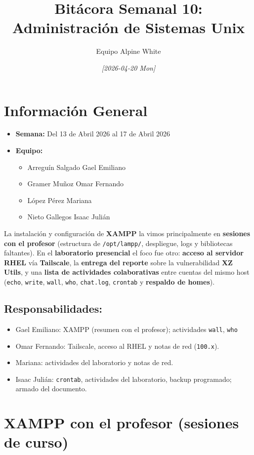 \documentclass[11pt, letterpaper]{article}
\author{Equipo Alpine White}
\date{\textit{{[}2026-04-20 Mon]}}
\title{Bitácora Semanal 10: Administración de Sistemas Unix}
\begin{document}
\maketitle
\setcounter{tocdepth}{2}
\tableofcontents

\section{Información General}
\label{sec:orge581e29}
\begin{itemize}
\item \textbf{Semana:} Del 13 de Abril 2026 al 17 de Abril 2026
\item \textbf{Equipo:}
\begin{itemize}
\item Arreguín Salgado Gael Emiliano
\item Gramer Muñoz Omar Fernando
\item López Pérez Mariana
\item Nieto Gallegos Isaac Julián
\end{itemize}
\end{itemize}

La instalación y configuración de \textbf{XAMPP} la vimos principalmente en \textbf{sesiones con el profesor} (estructura de \texttt{/opt/lampp/}, despliegue, logs y bibliotecas faltantes). En el \textbf{laboratorio presencial} el foco fue otro: \textbf{acceso al servidor RHEL} vía \textbf{Tailscale}, la \textbf{entrega del reporte} sobre la vulnerabilidad \textbf{XZ Utils}, y una \textbf{lista de actividades colaborativas} entre cuentas del mismo host (\texttt{echo}, \texttt{write}, \texttt{wall}, \texttt{who}, \texttt{chat.log}, \texttt{crontab} y \textbf{respaldo de homes}).
\subsection{Responsabilidades:}
\label{sec:org053edf2}
\begin{itemize}
\item Gael Emiliano: XAMPP (resumen con el profesor); actividades \texttt{wall}, \texttt{who}
\item Omar Fernando: Tailscale, acceso al RHEL y notas de red (\texttt{100.x}).
\item Mariana: actividades del laboratorio y notas de red.
\item Isaac Julián: \texttt{crontab}, actividades del laboratorio, backup programado; armado del documento.
\end{itemize}
\section{XAMPP con el profesor (sesiones de curso)}
\label{sec:org6bce521}
\end{document}
